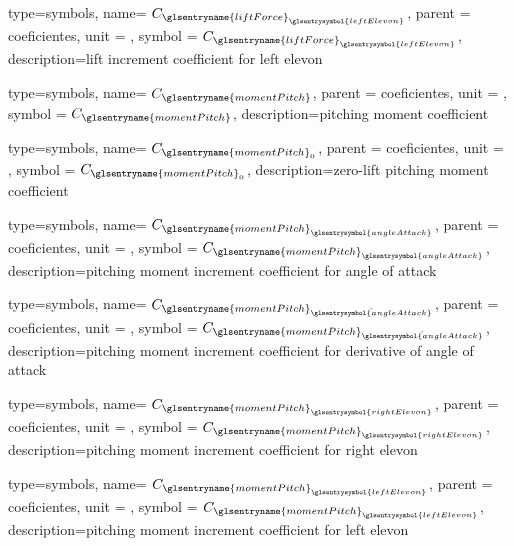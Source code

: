 {type=symbols,
    name= \ensuremath{C_{{\glsentryname{liftForce}}_{\glsentrysymbol{leftElevon}}}},
    parent = {coeficientes},
    unit = \unexpanded{},
    symbol = \ensuremath{C_{{\glsentryname{liftForce}}_{\glsentrysymbol{leftElevon}}}},
    description={lift increment coefficient for left elevon}
}



{type=symbols,
    name= \ensuremath{C_{\glsentryname{momentPitch}}},
    parent = {coeficientes},
    unit = \unexpanded{},
    symbol = \ensuremath{C_{\glsentryname{momentPitch}}},
    description={pitching moment coefficient}
}

{type=symbols,
    name= \ensuremath{C_{{\glsentryname{momentPitch}}_{0}}},
    parent = {coeficientes},
    unit = \unexpanded{},
    symbol = \ensuremath{C_{{\glsentryname{momentPitch}}_{0}}},
    description={zero-lift pitching moment coefficient}
}

{type=symbols,
    name= \ensuremath{C_{{\glsentryname{momentPitch}}_{\glsentrysymbol{angleAttack}}}},
    parent = {coeficientes},
    unit = \unexpanded{},
    symbol = \ensuremath{C_{{\glsentryname{momentPitch}}_{\glsentrysymbol{angleAttack}}}},
    description={pitching moment increment coefficient for angle of attack}
}

{type=symbols,
    name= \ensuremath{C_{{\glsentryname{momentPitch}}_{\dot{\glsentrysymbol{angleAttack}}}}},
    parent = {coeficientes},
    unit = \unexpanded{},
    symbol = \ensuremath{C_{{\glsentryname{momentPitch}}_{\dot{\glsentrysymbol{angleAttack}}}}},
    description={pitching moment increment coefficient for derivative of angle of attack}
}

{type=symbols,
    name= \ensuremath{C_{{\glsentryname{momentPitch}}_{\glsentrysymbol{rightElevon}}}},
    parent = {coeficientes},
    unit = \unexpanded{},
    symbol = \ensuremath{C_{{\glsentryname{momentPitch}}_{\glsentrysymbol{rightElevon}}}},
    description={pitching moment increment coefficient for right elevon }
}

{type=symbols,
    name= \ensuremath{C_{{\glsentryname{momentPitch}}_{\glsentrysymbol{leftElevon}}}},
    parent = {coeficientes},
    unit = \unexpanded{},
    symbol = \ensuremath{C_{{\glsentryname{momentPitch}}_{\glsentrysymbol{leftElevon}}}},
    description={pitching moment increment coefficient for left elevon }
}


